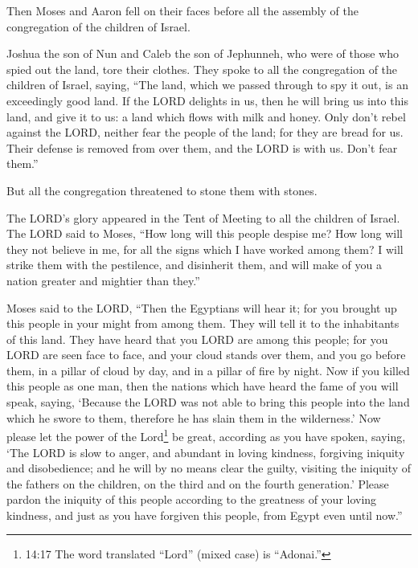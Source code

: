 \myverse{}Then Moses and Aaron fell on their faces before all the assembly
of the congregation of the children of Israel.


\myverse{}Joshua the son of Nun and Caleb the son of Jephunneh, who were
of those who spied out the land, tore their clothes.
\myverse{}They spoke to all the congregation of the children of Israel, saying, “The
land, which we passed through to spy it out, is an exceedingly good land.
\myverse{}If the LORD delights in us, then he will bring us into this land, and give
it to us: a land which flows with milk and honey.
\myverse{}Only don’t rebel against the LORD, neither fear the people of the land; for
they are bread for us. Their defense is removed from over them, and the LORD is with us. Don’t fear them.”


\myverse{}But all the congregation threatened to stone them with stones.

The LORD’s glory appeared in the Tent of Meeting to all the children of Israel.
\myverse{}The LORD said to Moses, “How long will this people despise me? How long will
they not believe in me, for all the signs which I have worked among them?
\myverse{}I will strike them with the pestilence, and disinherit them, and will make
of you a nation greater and mightier than they.”


\myverse{}Moses said to the LORD, “Then the Egyptians will hear it; for
you brought up this people in your might from among them.
\myverse{}They will tell it to the inhabitants of this land. They have heard that you
LORD are among this people; for you LORD are seen face to face, and your cloud stands over them, and you
go before them, in a pillar of cloud by day, and in a pillar of fire by night.
\myverse{}Now if you killed this people as one man, then the nations which have heard
the fame of you will speak, saying,
\myverse{}‘Because the LORD was not able to bring this people into the land which he
swore to them, therefore he has slain them in the wilderness.’
\myverse{}Now please let the power of the Lord\footnote{ 14:17 The word translated “Lord” (mixed case) is “Adonai.”} be great, according as you have
spoken, saying,
\myverse{}‘The LORD is slow to anger, and abundant in loving kindness, forgiving iniquity
and disobedience; and he will by no means clear the guilty, visiting the iniquity of the fathers on the
children, on the third and on the fourth generation.’
\myverse{}Please pardon the iniquity of this people according to the greatness of your
loving kindness, and just as you have forgiven this people, from Egypt even until now.”


